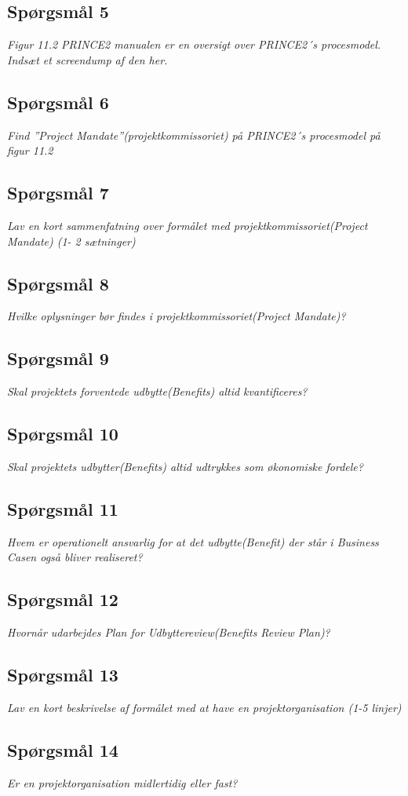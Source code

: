 \documentclass[12pt,twoside]{article}
\begin{document}
    \subsection{Spørgsmål 5}
    \textit{Figur 11.2 PRINCE2 manualen er en oversigt over PRINCE2´s procesmodel. Indsæt et screendump af den her.}
    \subsection{Spørgsmål 6}
    \textit{Find ”Project Mandate”(projektkommissoriet) på PRINCE2´s procesmodel på figur 11.2}
    \subsection{Spørgsmål 7}
    \textit{Lav en kort sammenfatning over formålet med projektkommissoriet(Project Mandate) (1- 2 sætninger)}
    \subsection{Spørgsmål 8}
    \textit{Hvilke oplysninger bør findes i projektkommissoriet(Project Mandate)?}
    \subsection{Spørgsmål 9}
    \textit{Skal projektets forventede udbytte(Benefits) altid kvantificeres?}
    \subsection{Spørgsmål 10}
    \textit{Skal projektets udbytter(Benefits) altid udtrykkes som økonomiske fordele?}
    \subsection{Spørgsmål 11}
    \textit{Hvem er operationelt ansvarlig for at det udbytte(Benefit) der står i Business Casen også bliver realiseret?}
    \subsection{Spørgsmål 12}
    \textit{Hvornår udarbejdes Plan for Udbyttereview(Benefits Review Plan)?}
    \subsection{Spørgsmål 13}
    \textit{Lav en kort beskrivelse af formålet med at have en projektorganisation (1-5 linjer)}
    \subsection{Spørgsmål 14}
    \textit{Er en projektorganisation midlertidig eller fast?}
\end{document}

